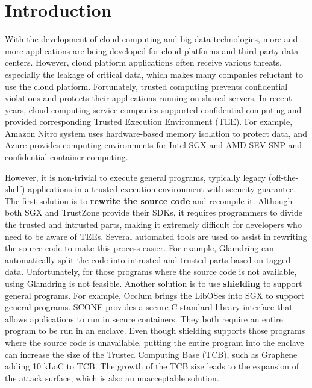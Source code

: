 \section{Introduction}
With the development of cloud computing and big data technologies,
more and more applications are being developed for cloud platforms
and third-party data centers. However, cloud platform applications
often receive various threats, especially the leakage of critical data,
which makes many companies reluctant to use the cloud platform.
Fortunately, trusted computing prevents confidential violations and
protects their applications running on shared servers.
In recent years, cloud computing service companies supported confidential
computing and provided corresponding Trusted Execution Environment (TEE).
For example, Amazon Nitro system \cite{AmazonNitro} uses hardware-based memory
isolation to protect data, and Azure \cite{AzureDocs} provides computing environments
for Intel SGX and AMD SEV-SNP and confidential container computing.

However, it is non-trivial to execute general programs, typically legacy (off-the-shelf)
applications in a trusted execution environment with security guarantee.
The first solution is to \textbf{rewrite the source code} and recompile it.
Although both SGX and TrustZone provide their SDKs, it requires programmers
to divide the trusted and intrusted parts, making it extremely difficult for
developers who need to be aware of TEEs. Several automated tools are used to assist
in rewriting the source code to make this process easier.
For example, Glamdring \cite{Lind2017GlamdringAA} can automatically
split the code into intrusted and trusted parts based on tagged data.
Unfortunately, for those programs where the source code is not available,
using Glamdring is not feasible.
Another solution is to use \textbf{shielding} to support general programs.
For example, Occlum \cite{Shen2020OcclumSA} brings the LibOSes
into SGX to support general programs. SCONE \cite{Arnautov2016SCONESL}
provides a secure C standard library interface that allows applications to
run in secure containers. They both require an entire program to be run in an enclave.
Even though shielding supports those programs where the source code is unavailable,
putting the entire program into the enclave can increase the size of the
Trusted Computing Base (TCB), such as Graphene \cite{Tsai2017GrapheneSGXAP}
adding 10 kLoC to TCB.
The growth of the TCB size leads to the expansion of the attack surface,
which is also an unacceptable solution.

